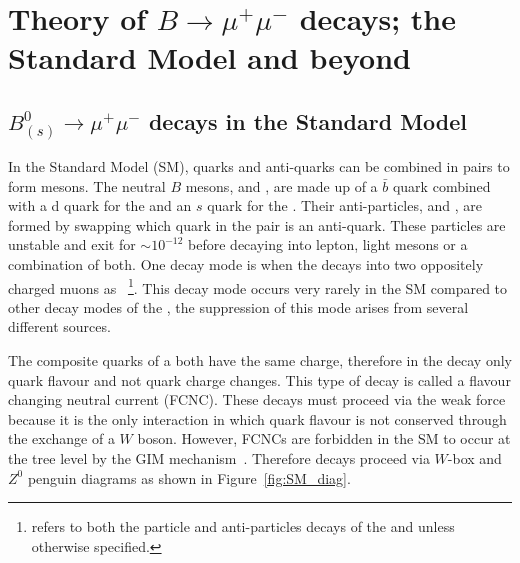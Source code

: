 \chapter{Theory of $B\to \mu^+ \mu^-$ decays; the Standard Model and beyond}
\label{sec:theory_chptr}
\section{$B^0_{(s)}\to \mu^+ \mu^-$ decays in the Standard Model}
\label{sec:bsmumu_in_SM}
In the Standard Model (SM), quarks and anti-quarks can be combined in pairs to form mesons. The neutral $B$ mesons, \bd and \bs, are made up of a $\bar{b}$ quark combined with a d quark for the \bd and an $s$ quark for the \bs. Their anti-particles, \barbd and \barbs, are formed by swapping which quark in the pair is an anti-quark. These particles are unstable and exit for $\sim 10^{-12}$ before decaying into lepton, light mesons or a combination of both. One decay mode is when the \bsd decays into two oppositely charged muons as \bmumu~\footnote{\bmumu refers to both the particle and anti-particles decays of the \bd and \bs unless otherwise specified.}. This decay mode occurs very rarely in the SM compared to other decay modes of the \bsd, the suppression of this mode arises from several different sources.

The composite quarks of a \bsd both have the same charge, therefore in the decay \bmumu only quark flavour and not quark charge changes. This type of decay is called a flavour changing neutral current (FCNC). These decays must proceed via the weak force because it is the only interaction in which quark flavour is not conserved through the exchange of a $W$ boson. However, FCNCs are forbidden in the SM to occur at the tree level by the GIM mechanism~\cite{}. Therefore \bmumu decays proceed via $W$-box and $Z^0$ penguin diagrams as shown in Figure~\ref{fig:SM_diag}.

